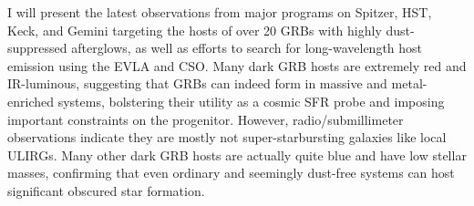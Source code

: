 


\bigskip



\bigskip

\noindent I will present the latest observations from major programs on Spitzer, HST, Keck, and Gemini targeting the hosts of over 20 GRBs with highly dust-suppressed afterglows, as well as efforts to search for long-wavelength host emission using the EVLA and CSO.  Many dark GRB hosts are extremely red and IR-luminous, suggesting that GRBs can indeed form in massive and metal-enriched systems, bolstering their utility as a cosmic SFR probe and imposing important constraints on the progenitor.  However, radio/submillimeter observations indicate they are mostly not super-starbursting galaxies like local ULIRGs.  Many other dark GRB hosts are actually quite blue and have low stellar masses, confirming that even ordinary and seemingly dust-free systems can host significant obscured star formation.

